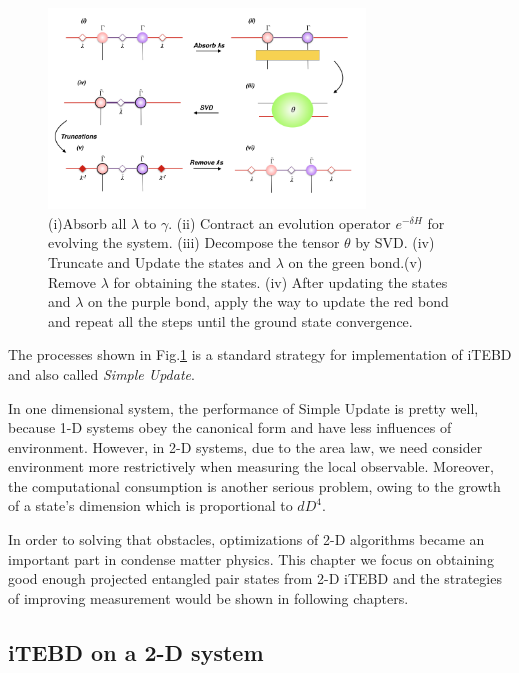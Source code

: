 \label{1ditebd}
\begin{figure}[ht]
	\centering
	\includegraphics[width=0.75\textwidth]{figures/fig313.png}
	\caption[The tensor network diagrams for the 1-D iTEBD]{ (i)Absorb all $\lambda$ to $\gamma$. (ii) Contract an evolution operator $e^{-\delta H}$ for evolving the system. (iii) Decompose the tensor $\theta$ by SVD. (iv) Truncate and Update the states and $\lambda$ on the green bond.(v) Remove $
		\lambda$ for obtaining the states. (iv) After updating the states and $\lambda$ on the purple bond, apply the way to update the red bond and repeat all the steps until the ground state convergence.}
	\label{fig313}
\end{figure}

The processes shown in Fig.\ref{fig313} is a standard strategy for implementation of iTEBD and also called \textit{Simple Update}. 

In one dimensional system, the performance of Simple Update is pretty well, because 1-D systems obey the canonical form and have less influences of environment. However, in 2-D systems, due to the area law, we need consider environment more restrictively when measuring the local observable. Moreover, the computational consumption is another serious problem, owing to the growth of a state's dimension which is proportional to $dD^4$.

In order to solving that obstacles, optimizations of 2-D algorithms  became an important part in condense matter physics. This chapter we focus on obtaining good enough projected entangled pair states from 2-D iTEBD and the strategies of improving measurement would be shown in following chapters.

\subsection{iTEBD on a 2-D system}
\label{2ditebd}

